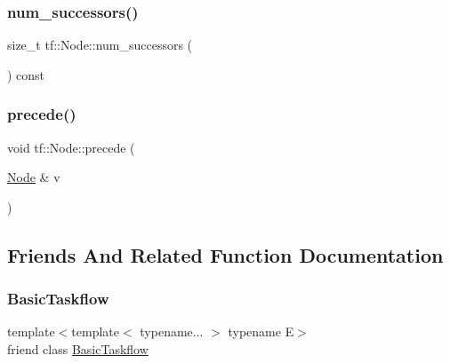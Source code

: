 \subsubsection{\texorpdfstring{num\+\_\+successors()}{num\_successors()}}
{\footnotesize\ttfamily size\+\_\+t tf\+::\+Node\+::num\+\_\+successors (\begin{DoxyParamCaption}{ }\end{DoxyParamCaption}) const\hspace{0.3cm}{\ttfamily [inline]}}

\mbox{\label{classtf_1_1Node_a753839c8159372098e7f48158229865c}} 
\subsubsection{\texorpdfstring{precede()}{precede()}}
{\footnotesize\ttfamily void tf\+::\+Node\+::precede (\begin{DoxyParamCaption}\item[{\hyperlink{classtf_1_1Node}{Node} \&}]{v }\end{DoxyParamCaption})\hspace{0.3cm}{\ttfamily [inline]}}



\subsection{Friends And Related Function Documentation}
\mbox{\label{classtf_1_1Node_ab3ad8c5c7ed22c3fbd8a41b84db75083}} 
\subsubsection{\texorpdfstring{Basic\+Taskflow}{BasicTaskflow}}
{\footnotesize\ttfamily template$<$template$<$ typename... $>$ typename E$>$ \\
friend class \hyperlink{classtf_1_1BasicTaskflow}{Basic\+Taskflow}\hspace{0.3cm}{\ttfamily [friend]}}

\mbox{\label{classtf_1_1Node_aaa7728226b6ce66782e8816b1658dd9a}} 
